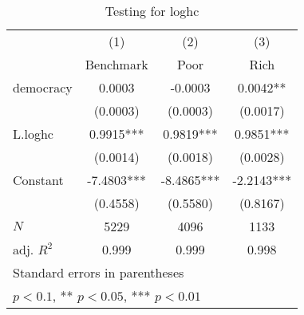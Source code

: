 \begin{table}[htbp]\centering
\def\sym#1{\ifmmode^{#1}\else\(^{#1}\)\fi}
\caption{Testing for loghc \label{tab:testingloghc}}
\begin{tabular}{l*{3}{c}}
\hline\hline
            &\multicolumn{1}{c}{(1)}&\multicolumn{1}{c}{(2)}&\multicolumn{1}{c}{(3)}\\
            &\multicolumn{1}{c}{Benchmark}&\multicolumn{1}{c}{Poor}&\multicolumn{1}{c}{Rich}\\
\hline
democracy   &      0.0003   &     -0.0003   &      0.0042** \\
            &    (0.0003)   &    (0.0003)   &    (0.0017)   \\
[1em]
L.loghc     &      0.9915***&      0.9819***&      0.9851***\\
            &    (0.0014)   &    (0.0018)   &    (0.0028)   \\
[1em]
Constant    &     -7.4803***&     -8.4865***&     -2.2143***\\
            &    (0.4558)   &    (0.5580)   &    (0.8167)   \\
\hline
\(N\)       &        5229   &        4096   &        1133   \\
adj. \(R^{2}\)&       0.999   &       0.999   &       0.998   \\
\hline\hline
\multicolumn{4}{l}{\footnotesize Standard errors in parentheses}\\
\multicolumn{4}{l}{\footnotesize * \(p<0.1\), ** \(p<0.05\), *** \(p<0.01\)}\\
\end{tabular}
\end{table}

